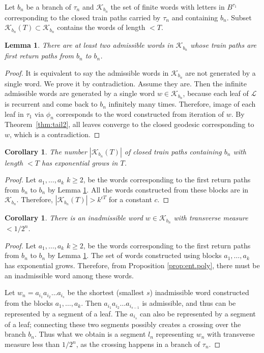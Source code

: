 \documentclass[11pt]{article} %
\theoremstyle{plain}
\newtheorem{lm}[thm]{Lemma}
\newtheorem{cor}[thm]{Corollary}
\theoremstyle{definition}
\numberwithin{equation}{section}
\begin{document}
 
 
 Let $b_n$ be a branch of $\tau_n$ and $\mathcal{K}_{b_n}$ the set of finite words with letters in $B^{\tau_1}$ corresponding to the closed train paths carried by $\tau_n$ and containing $b_n$. Subset $\mathcal{K}_{b_n}(T) \subset \mathcal{K}_{b_n}$ contains the words of length $<T$.
 \begin{lm}\label{lm:2admisible}
 There are at least two admissible words in $\mathcal{K}_{b_n}$ whose train paths are first return paths from $b_n$ to $b_n$.
 \end{lm}
 
 \begin{proof}
It is equivalent to say the admissible words in $\mathcal{K}_{b_n}$ are not generated by a single word. We prove it by contradiction. Assume they are. Then the infinite admissible words are generated by a single word $w \in \mathcal{K}_{b_n}$, because each leaf of $\mathcal{L}$ is recurrent and come back to $b_n$ infinitely many times. Therefore, image of each leaf in $\tau_1$ via $\phi_n$ corresponds to the word constructed from iteration of $w$. By Theorem~\ref{thm:tail2}, all leaves converge to the closed geodesic corresponding to $w$, which is a contradiction. 
 \end{proof}
 

\begin{cor} \label{cor:ent.exp}
 The number $|\mathcal{K}_{b_n}(T)|$ of closed train paths containing $b_n$ with length $<T$ has exponential grows in $T$.
\end{cor}
\begin{proof}
Let $a_1, \dots, a_k$ $k \geq 2$, be the words corresponding to the first return paths from $b_n$ to $b_n$ by Lemma \ref{lm:2admisible}. All the words constructed from these blocks are in $\mathcal{K}_{b_n}$. Therefore, $|\mathcal{K}_{b_n}(T)|> k^{cT}$ for a constant $c$.
\end{proof}


\begin{cor} \label{cor:inadmissible}
There is an inadmissible word $w \in \mathcal{K}_{b_n}$ with transverse measure $< 1/2^n$. 
\end{cor}
\begin{proof}
Let $a_1, \dots, a_k$ $k \geq 2$, be the words corresponding to the first return paths from $b_n$ to $b_n$ by Lemma \ref{lm:2admisible}. The set of words constructed using blocks $a_1, \dots, a_k$ has exponential grows. Therefore, from Proposition \ref{prop:ent.poly}, there must be an inadmissible word among these words.
 
 Let $w_n=a_{i_1}a_{i_2}\dots a_{i_s}$ be the shortest (smallest $s$) inadmissible word constructed from the blocks $a_1, \dots, a_k$. Then $a_{i_1}a_{i_2}\dots a_{i_{s-1}}$ is admissible, and thus can be represented by a segment of a leaf. The $a_{i_s}$ can also be represented by a segment of a leaf; connecting these two segments possibly creates a crossing over the branch $b_n$. Thus what we obtain is a segment $l_n$ representing $w_n$ with transverse measure less than $1/2^n$, as the crossing happens in a branch of $\tau_n$.
\end{proof}
\end{document}
